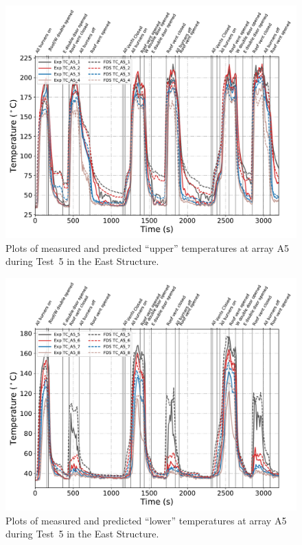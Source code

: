 \clearpage
\begin{figure}[p]
	\centering
	\includegraphics[width=\columnwidth]{Figures/Plots/Validation/Temperature/Test_5_TC_A5_upper}
	\caption{Plots of measured and predicted ``upper'' temperatures at array A5 during Test~5 in the East Structure.}
	\label{fig:TCA5_upper_data_Test5}
\end{figure}
\begin{figure}[p]
	\centering
	\includegraphics[width=\columnwidth]{Figures/Plots/Validation/Temperature/Test_5_TC_A5_lower}
	\caption{Plots of measured and predicted ``lower'' temperatures at array A5 during Test~5 in the East Structure.}
	\label{fig:TCA5_lower_data_Test5}
\end{figure}

